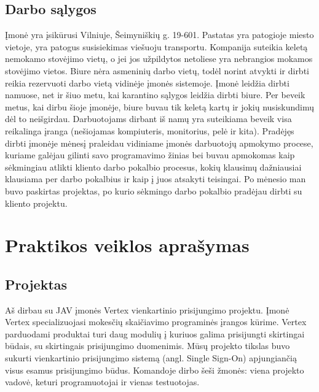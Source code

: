 \documentclass{VUMIFPSkursinis}
\begin{document}
	\subsection{Darbo sąlygos}
			Įmonė yra įsikūrusi Vilniuje, Šeimyniškių g. 19-601.
			Pastatas yra patogioje miesto vietoje, yra patogus susisiekimas viešuoju transportu.
			Kompanija suteikia keletą nemokamo stovėjimo vietų, o jei jos užpildytos netoliese yra nebrangios mokamos
			stovėjimo vietos.
			Biure nėra asmeninių darbo vietų, todėl norint atvykti ir dirbti reikia rezervuoti darbo vietą vidinėje
			įmonės sistemoje.
			Įmonė leidžia dirbti namuose, net ir šiuo metu, kai karantino sąlygos leidžia dirbti biure.
			Per beveik metus, kai dirbu šioje įmonėje, biure buvau tik keletą kartų ir jokių nusiskundimų dėl to neišgirdau.
			Darbuotojams dirbant iš namų yra suteikiama beveik visa reikalinga įranga (nešiojamas kompiuteris, monitorius, pelė ir kita).
			Pradėjęs dirbti įmonėje mėnesį praleidau vidiniame įmonės darbuotojų apmokymo procese, kuriame galėjau 
			gilinti savo programavimo žinias bei buvau apmokomas kaip sėkmingiau atlikti kliento darbo pokalbio procesus, 
			kokių klausimų dažniausiai klausiama per darbo pokalbius ir kaip į juos atsakyti teisingai.
			Po mėnesio man buvo paskirtas projektas, po kurio sėkmingo darbo pokalbio pradėjau dirbti su kliento projektu.
		
		
\section{Praktikos veiklos aprašymas}
	\subsection{Projektas}
		Aš dirbau su JAV įmonės Vertex vienkartinio prisijungimo projektu. Įmonė Vertex specializuojasi mokesčių
		skaičiavimo programinės įrangos kūrime. Vertex parduodami produktai turi daug modulių į kuriuos galima prisijungti skirtingai būdais, su skirtingais prisijungimo duomenimis. Mūsų projekto tikslas buvo sukurti vienkartinio 
		prisijungimo sistemą (angl. Single Sign-On) apjungiančią visus esamus prisijungimo būdus.
		Komandoje dirbo šeši žmonės: viena projekto vadovė, keturi programuotojai ir vienas testuotojas.
		
\end{document}
